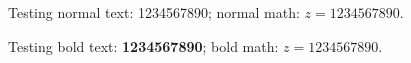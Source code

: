 \documentclass{article}
\begin{document}
\noindent
Testing normal text: 1234567890; normal math: $z = 1234567890$.
\par\vspace{1cm}\noindent
Testing bold text: \textbf{1234567890}; bold math:
{\boldmath $z = 1234567890$}.
\end{document}
